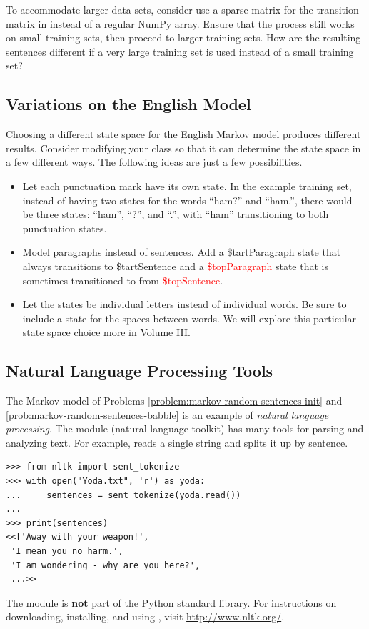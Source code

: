 To accommodate larger data sets, consider use a sparse matrix for the transition matrix in instead of a regular NumPy array. %
Ensure that the process still works on small training sets, then proceed to larger training sets.
How are the resulting sentences different if a very large training set is used instead of a small training set?

\subsection*{Variations on the English Model} %

Choosing a different state space for the English Markov model produces different results.
Consider modifying your  class so that it can determine the state space in a few different ways.
The following ideas are just a few possibilities.

\begin{itemize}
\item Let each punctuation mark have its own state.
In the example training set, instead of having two states for the words ``ham?'' and ``ham.'', there would be three states: ``ham'', ``?'', and ``.'', with ``ham'' transitioning to both punctuation states.
\item Model paragraphs instead of sentences.
Add a \textcolor[rgb]{0,.6,0}{\$tartParagraph} state that always transitions to \textcolor[rgb]{0,.6,0}{\$tartSentence} and a \textcolor{red}{\$topParagraph} state that is sometimes transitioned to from \textcolor{red}{\$topSentence}.
\item Let the states be individual letters instead of individual words.
Be sure to include a state for the spaces between words.
We will explore this particular state space choice more in Volume III.
\end{itemize}

\subsection*{Natural Language Processing Tools} %

The Markov model of Problems \ref{problem:markov-random-sentences-init} and \ref{prob:markov-random-sentences-babble} is an example of \emph{natural language processing}.
The  module (natural language toolkit) has many tools for parsing and analyzing text.
For example,  reads a single string and splits it up by sentence.

\begin{lstlisting}
>>> from nltk import sent_tokenize
>>> with open("Yoda.txt", 'r') as yoda:
...     sentences = sent_tokenize(yoda.read())
...
>>> print(sentences)
<<['Away with your weapon!',
 'I mean you no harm.',
 'I am wondering - why are you here?',
 ...>>
\end{lstlisting}

The  module is \textbf{not} part of the Python standard library.
For instructions on downloading, installing, and using , visit \url{http://www.nltk.org/}.
